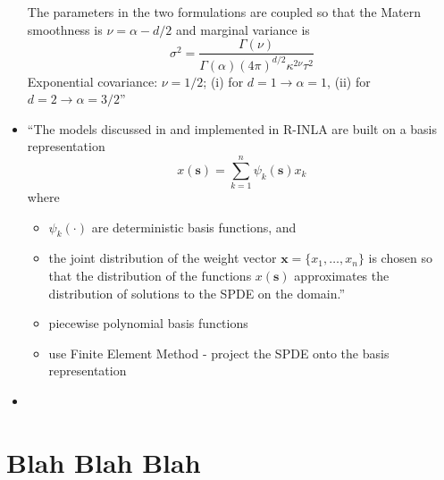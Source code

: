 \documentclass{article}
\begin{document}
\begin{itemize}
The parameters in the two formulations are coupled so that the Matern smoothness is $\nu = \alpha - d/2$ and marginal variance is
$$\sigma^{2} = \frac{\Gamma(\nu)}{\Gamma(\alpha)(4\pi)^{d/2}\kappa^{2\nu}\tau^{2}}$$
Exponential covariance: $\nu = 1/2$; (i) for $d = 1 \rightarrow  \alpha = 1$, (ii) for $d = 2 \rightarrow \alpha = 3/2$''
\item ``The models discussed in \cite{Lindgren2011} and implemented in R-INLA are built on a basis representation
$$ x(\pmb{s}) = \sum_{k=1}^{n} \psi_{k}(\pmb{s})x_{k}$$
where
      \begin{itemize}
      \item $\psi_{k}(\cdot)$ are deterministic basis functions, and
      \item the joint distribution of the weight vector $\pmb{x} = \{x_{1},\dots,x_{n}\}$ is chosen so that the distribution of the functions $x(\pmb{s})$ approximates the distribution of solutions to the SPDE on the domain.''
      \item piecewise polynomial basis functions
      \item use Finite Element Method - project the SPDE onto the basis representation 
      \end{itemize}
\item 
\end{itemize}

\appendix
\section{Blah Blah Blah} %


\end{document}
